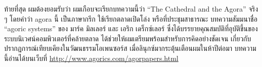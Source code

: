 \noindent  ท้ายที่สุด ผมต้องยอมรับว่า ผมเกือบจะเรียกบทความนี้ว่า ``The Cathedral
and the Agora'' จริง ๆ  โดยคำว่า agora นี้ เป็นภาษากรีก
ใช้เรียกตลาดเปิดโล่ง หรือที่ประชุมสาธารณะ บทความสัมมนาชื่อ ``agoric
systems'' ของ มาร์ค มิลเลอร์ และ เอริก เดร็กซ์เลอร์
ซึ่งได้บรรยายคุณสมบัติที่อุบัติขึ้นของระบบนิเวศน์คอมพิวเตอร์ที่คล้ายตลาด
ได้ช่วยให้ผมเตรียมพร้อมสำหรับการคิดอย่างชัดเจน
เกี่ยวกับปรากฏการณ์เทียบเคียงในวัฒนธรรมโอเพนซอร์ส
เมื่อลินุกซ์มากระตุ้นเตือนผมในห้าปีต่อมา บทความนี้อ่านได้บนเว็บที่
\url{http://www.agorics.com/agorpapers.html}